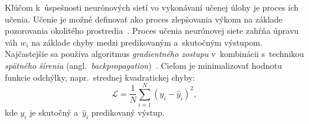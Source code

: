   Kľúčom k~úspešnosti neurónových sietí vo vykonávaní učenej úlohy je proces ich učenia. Učenie je možné definovať ako proces zlepšovania výkonu na základe pozorovania okolitého prostredia~\cite{russellArtificialIntelligenceModern2010}. Proces učenia neurónovej siete zahŕňa úpravu váh $w_i$ na základe chyby medzi predikovaným a~skutočným výstupom. Najčastejšie sa používa algoritmus \emph{gradientného zostupu} v~kombinácii s~technikou \emph{spätného šírenia} (angl.\ \emph{backpropagation})~\cite{rumelhartLearningRepresentationsBackpropagating1986}. Cieľom je minimalizovať hodnotu funkcie odchýlky, napr.\ strednej kvadratickej chyby:
  \begin{equation}
  \mathcal{L} = \frac{1}{N} \sum_{i=1}^{N} {(y_i - \hat{y}_i)}^2,
  \end{equation}
  kde $y_i$ je skutočný a~$\hat{y}_i$ predikovaný výstup.
  

